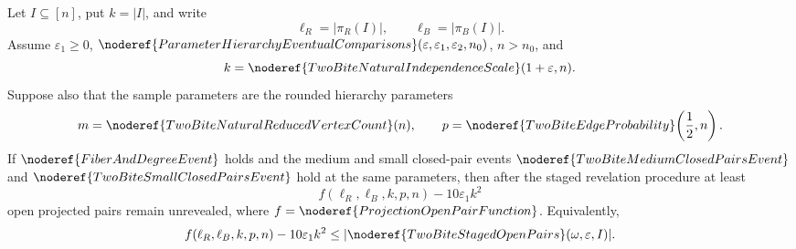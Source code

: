 \begin{lemma}
Let \(I\subseteq [n]\), put \(k=|I|\), and write
\[
\ell_R=|\pi_R(I)|,\qquad \ell_B=|\pi_B(I)|.
\]
Assume \(\varepsilon_1\ge0\),
\(\noderef{ParameterHierarchyEventualComparisons}(\varepsilon,\varepsilon_1,
\varepsilon_2,n_0)\), \(n>n_0\), and
\[
k=\noderef{TwoBiteNaturalIndependenceScale}(1+\varepsilon,n).
\]
Suppose also that the sample parameters are the rounded hierarchy parameters
\[
m=\noderef{TwoBiteNaturalReducedVertexCount}(n),
\qquad
p=\noderef{TwoBiteEdgeProbability}\!\left(\frac12,n\right).
\]
If \(\noderef{FiberAndDegreeEvent}\) holds and the medium and small closed-pair
events \(\noderef{TwoBiteMediumClosedPairsEvent}\) and
\(\noderef{TwoBiteSmallClosedPairsEvent}\) hold at the same parameters, then
after the staged revelation procedure at least
\[
f(\ell_R,\ell_B,k,p,n)-10\varepsilon_1k^2
\]
open projected pairs remain unrevealed, where
\(f=\noderef{ProjectionOpenPairFunction}\).  Equivalently,
\[
f(\ell_R,\ell_B,k,p,n)-10\varepsilon_1k^2
\le |\noderef{TwoBiteStagedOpenPairs}(\omega,\varepsilon,I)|.
\]
\end{lemma}
